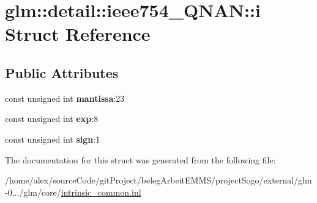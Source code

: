 \hypertarget{structglm_1_1detail_1_1ieee754__QNAN_1_1i}{\section{glm\-:\-:detail\-:\-:ieee754\-\_\-\-Q\-N\-A\-N\-:\-:i Struct Reference}
\label{structglm_1_1detail_1_1ieee754__QNAN_1_1i}
}
\subsection*{Public Attributes}
\begin{DoxyCompactItemize}
\item 
\hypertarget{structglm_1_1detail_1_1ieee754__QNAN_1_1i_a1999926defcba631a716bee7d3044d0a}{const unsigned int {\bfseries mantissa}\-:23}\label{structglm_1_1detail_1_1ieee754__QNAN_1_1i_a1999926defcba631a716bee7d3044d0a}

\item 
\hypertarget{structglm_1_1detail_1_1ieee754__QNAN_1_1i_abc8cdb38ff3aa6a09214f7bfa32efac8}{const unsigned int {\bfseries exp}\-:8}\label{structglm_1_1detail_1_1ieee754__QNAN_1_1i_abc8cdb38ff3aa6a09214f7bfa32efac8}

\item 
\hypertarget{structglm_1_1detail_1_1ieee754__QNAN_1_1i_a5dd7e174864b6a8cd045563dde44f305}{const unsigned int {\bfseries sign}\-:1}\label{structglm_1_1detail_1_1ieee754__QNAN_1_1i_a5dd7e174864b6a8cd045563dde44f305}

\end{DoxyCompactItemize}


The documentation for this struct was generated from the following file\-:\begin{DoxyCompactItemize}
\item 
/home/alex/source\-Code/git\-Project/beleg\-Arbeit\-E\-M\-M\-S/project\-Sogo/external/glm-\/0.../glm/core/\hyperlink{intrinsic__common_8inl}{intrinsic\-\_\-common.\-inl}\end{DoxyCompactItemize}
